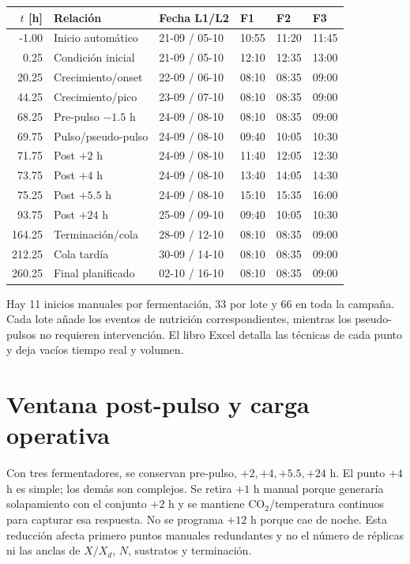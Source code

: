 \documentclass[11pt,a4paper]{article}
\begin{document}
\begin{longtable}{@{}r l l l l l@{}}
\toprule
\(t\) [h] & Relación & Fecha L1/L2 & F1 & F2 & F3\\
\midrule
\endhead
-1.00 & Inicio automático & 21-09 / 05-10 & 10:55 & 11:20 & 11:45\\
0.25 & Condición inicial & 21-09 / 05-10 & 12:10 & 12:35 & 13:00\\
20.25 & Crecimiento/onset & 22-09 / 06-10 & 08:10 & 08:35 & 09:00\\
44.25 & Crecimiento/pico & 23-09 / 07-10 & 08:10 & 08:35 & 09:00\\
68.25 & Pre-pulso \(-1.5\) h & 24-09 / 08-10 & 08:10 & 08:35 & 09:00\\
69.75 & Pulso/pseudo-pulso & 24-09 / 08-10 & 09:40 & 10:05 & 10:30\\
71.75 & Post \(+2\) h & 24-09 / 08-10 & 11:40 & 12:05 & 12:30\\
73.75 & Post \(+4\) h & 24-09 / 08-10 & 13:40 & 14:05 & 14:30\\
75.25 & Post \(+5.5\) h & 24-09 / 08-10 & 15:10 & 15:35 & 16:00\\
93.75 & Post \(+24\) h & 25-09 / 09-10 & 09:40 & 10:05 & 10:30\\
164.25 & Terminación/cola & 28-09 / 12-10 & 08:10 & 08:35 & 09:00\\
212.25 & Cola tardía & 30-09 / 14-10 & 08:10 & 08:35 & 09:00\\
260.25 & Final planificado & 02-10 / 16-10 & 08:10 & 08:35 & 09:00\\
\bottomrule
\end{longtable}

Hay 11 inicios manuales por fermentación, 33 por lote y 66 en toda la campaña.
Cada lote añade los eventos de nutrición correspondientes, mientras los
pseudo-pulsos no requieren intervención. El libro Excel detalla las técnicas de
cada punto y deja vacíos tiempo real y volumen.

\section{Ventana post-pulso y carga operativa}

Con tres fermentadores, se conservan pre-pulso, \(+2,+4,+5.5,+24\) h. El punto
\(+4\) h es simple; los demás son complejos. Se retira \(+1\) h manual porque
generaría solapamiento con el conjunto \(+2\) h y se mantiene CO$_2$/temperatura
continuos para capturar esa respuesta. No se programa \(+12\) h porque cae de
noche. Esta reducción afecta primero puntos manuales redundantes y no el número
de réplicas ni las anclas de \(X/X_d\), \(N\), sustratos y terminación.
\end{document}

